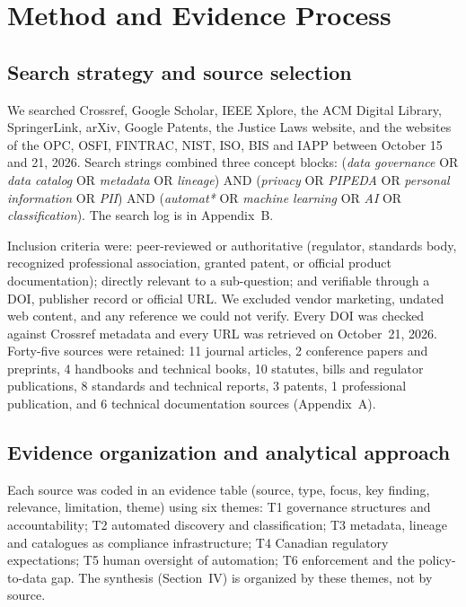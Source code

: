 \documentclass[journal,onecolumn,11pt]{IEEEtran}
\begin{document}
\section{Method and Evidence Process}
\subsection{Search strategy and source selection}
We searched Crossref, Google Scholar, IEEE Xplore, the ACM Digital Library, SpringerLink, arXiv, Google Patents, the Justice Laws website, and the websites of the OPC, OSFI, FINTRAC, NIST, ISO, BIS and IAPP between October 15 and 21, 2026. Search strings combined three concept blocks: (\emph{data governance} OR \emph{data catalog} OR \emph{metadata} OR \emph{lineage}) AND (\emph{privacy} OR \emph{PIPEDA} OR \emph{personal information} OR \emph{PII}) AND (\emph{automat*} OR \emph{machine learning} OR \emph{AI} OR \emph{classification}). The search log is in Appendix~B.

Inclusion criteria were: peer-reviewed or authoritative (regulator, standards body, recognized professional association, granted patent, or official product documentation); directly relevant to a sub-question; and verifiable through a DOI, publisher record or official URL. We excluded vendor marketing, undated web content, and any reference we could not verify. Every DOI was checked against Crossref metadata and every URL was retrieved on October~21, 2026. Forty-five sources were retained: 11 journal articles, 2 conference papers and preprints, 4 handbooks and technical books, 10 statutes, bills and regulator publications, 8 standards and technical reports, 3 patents, 1 professional publication, and 6 technical documentation sources (Appendix~A).

\subsection{Evidence organization and analytical approach}
Each source was coded in an evidence table (source, type, focus, key finding, relevance, limitation, theme) using six themes: T1 governance structures and accountability; T2 automated discovery and classification; T3 metadata, lineage and catalogues as compliance infrastructure; T4 Canadian regulatory expectations; T5 human oversight of automation; T6 enforcement and the policy-to-data gap. The synthesis (Section~IV) is organized by these themes, not by source.
\end{document}
